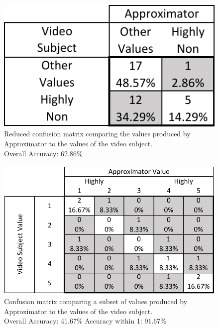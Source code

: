 \documentclass{sigchi}
\begin{document}
\begin{figure}[h]
  \centering
  \includegraphics[width=\columnwidth/2]{figures/VideoToApproximatorReducedConfusionMatrix.pdf}
  \caption{Reduced confusion matrix comparing the values produced by Approximator to the values of the video subject. \\Overall Accuracy: 62.86\%}
  \label{fig:reduced_video_to_approximator_matrix}
\end{figure}

\begin{figure}[h]
  \centering
  \includegraphics[width=\columnwidth]{figures/VideoToApproximatorConfusionMatrix(AndersValues).pdf}
  \caption{Confusion matrix comparing a subset of values produced by Approximator to the values of the video subject. \\Overall Accuracy: 41.67\% Accuracy within 1: 91.67\%}
  \label{fig:subset_video_to_approximator_matrix}
\end{figure}
\end{document}

